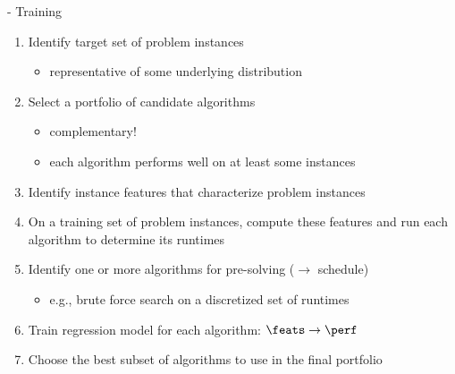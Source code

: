 % 
% 
% 
% 
\begin{frame}[c]{\satzilla{} - Training}

\begin{enumerate}
  \item Identify target set of \alert{problem instances} 
  \begin{itemize}
    \item representative of some underlying distribution
  \end{itemize}
  \item Select a \alert{portfolio} of candidate algorithms
  \begin{itemize}
    \item complementary!
    \item each algorithm performs well on at least some instances
  \end{itemize}
  \pause
  \medskip
  \item Identify \alert{instance features} that characterize problem instances
  \item On a training set of problem instances, compute these \alert{features} and run each algorithm to determine its \alert{runtimes}
  \pause
  \medskip
  \item Identify one or more algorithms for \alert{pre-solving} ($\to$ schedule)
  \begin{itemize}
    \item e.g., brute force search on a discretized set of runtimes
  \end{itemize} 
  \pause
  \medskip
  \item Train \alert{regression model} for each algorithm: $\feats \to \perf$
  \item Choose the \alert{best subset of algorithms} to use in the final portfolio
\end{enumerate}

\end{frame}
